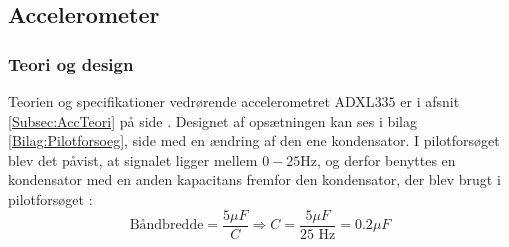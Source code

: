 \subsection{Accelerometer}\label{Acc_afsnit}
\subsubsection{Teori og design}
Teorien og specifikationer vedrørende accelerometret ADXL$335$ er i afsnit \ref{Subsec:AccTeori} på side \pageref{Subsec:AccTeori}. Designet af opsætningen kan ses i bilag \ref{Bilag:Pilotforsoeg}, side \pageref{Bilag:Pilotforsoeg} med en ændring af den ene kondensator. I pilotforsøget blev det påvist, at signalet ligger mellem $0-25$Hz, og derfor benyttes en kondensator med en anden kapacitans fremfor den kondensator, der blev brugt i pilotforsøget \cite{Devices2009}:
\begin{equation}
\text{Båndbredde} = \dfrac{5\mu F}{C} \Rightarrow  C = \dfrac{5\mu F}{\text{25 Hz}} = 0.2\mu F
\end{equation}

